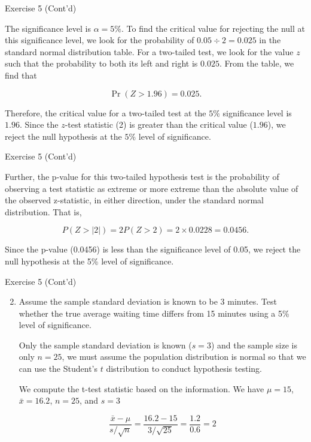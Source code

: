 \documentclass[
  ignorenonframetext,
  aspectratio=43,
]{beamer}
\let\olditem\item
\renewcommand\item{\olditem\justifying}
\begin{document}
\begin{frame}{Exercise 5 (Cont'd)}
\protect\hypertarget{exercise-5-contd-1}{}
\pause

The significance level is \(\alpha = 5\%\). To find the critical value
for rejecting the null at this significance level, we look for the
probability of \(0.05 \div 2 = 0.025\) in the standard normal
distribution table. For a two-tailed test, we look for the value \(z\)
such that the probability to both its left and right is \(0.025\). From
the table, we find that \vspace{-5pt}

\pause

\[
\Pr(Z > 1.96) = 0.025.
\]

\pause

Therefore, the critical value for a two-tailed test at the \(5\%\)
significance level is \(1.96\). Since the \(z\)-test statistic (2) is
greater than the critical value (\(1.96\)), we reject the null
hypothesis at the \(5\%\) level of significance.
\end{frame}

\begin{frame}{Exercise 5 (Cont'd)}
\protect\hypertarget{exercise-5-contd-2}{}
\pause

Further, the p-value for this two-tailed hypothesis test is the
probability of observing a test statistic as extreme or more extreme
than the absolute value of the observed z-statistic, in either
direction, under the standard normal distribution. That is,
\vspace{-5pt}

\pause

\[
P(Z > |2|) = 2P(Z > 2) = 2 \times 0.0228 = 0.0456.
\]

\pause

Since the p-value (0.0456) is less than the significance level of 0.05,
we reject the null hypothesis at the 5\% level of significance.
\end{frame}

\begin{frame}{Exercise 5 (Cont'd)}
\protect\hypertarget{exercise-5-contd-3}{}
\begin{enumerate}
\setcounter{enumi}{1}
\item
  Assume the sample standard deviation is known to be 3 minutes. Test
  whether the true average waiting time differs from 15 minutes using a
  5\% level of significance.

  \pause

  Only the sample standard deviation is known (\(s=3\)) and the sample
  size is only \(n=25\), we must assume the population distribution is
  normal so that we can use the Student's \(t\) distribution to conduct
  hypothesis testing.

  \pause

  We compute the t-test statistic based on the information. We have
  \(\mu = 15\), \(\bar{x} = 16.2\), \(n = 25\), and \(s = 3\)

  \pause

  \[
   \frac{\bar{x}-\mu}{s/\sqrt{n}}
   =
   \frac{16.2 - 15}{3/\sqrt{25}}
   =
   \frac{1.2}{0.6}
   =
   2
   \]
\end{enumerate}
\end{frame}
\end{document}
